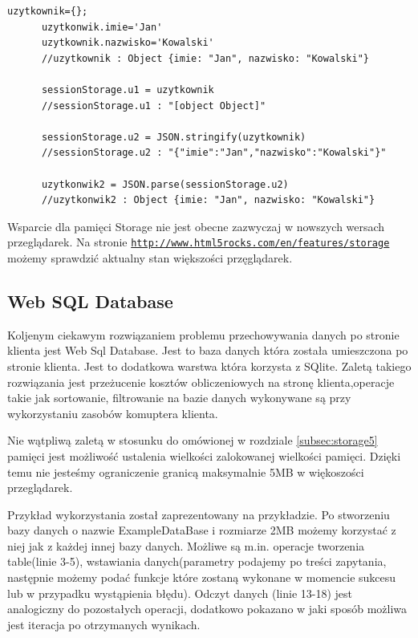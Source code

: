 \lstset{language=JavaScript}
\label{lis:storage}
\begin{lstlisting}[caption=json]
      uzytkownik={};
      uzytkonwik.imie='Jan'
      uzytkownik.nazwisko='Kowalski'
      //uzytkownik : Object {imie: "Jan", nazwisko: "Kowalski"}

      sessionStorage.u1 = uzytkownik
      //sessionStorage.u1 : "[object Object]"

      sessionStorage.u2 = JSON.stringify(uzytkownik)
      //sessionStorage.u2 : "{"imie":"Jan","nazwisko":"Kowalski"}"

      uzytkonwik2 = JSON.parse(sessionStorage.u2)
      //uzytkonwik2 : Object {imie: "Jan", nazwisko: "Kowalski"}
\end{lstlisting}



Wsparcie dla pamięci Storage nie jest obecne zazwyczaj w nowszych wersach przeglądarek. Na stronie \underline{\texttt{http://www.html5rocks.com/en/features/storage}} możemy sprawdzić aktualny stan większości przęglądarek.

\subsection{Web SQL Database}
\label{subsec:websql}

Koljenym ciekawym rozwiązaniem problemu przechowywania danych po stronie klienta jest Web Sql Database.
Jest to baza danych która została umieszczona po stronie klienta. Jest to dodatkowa warstwa która korzysta z SQlite.
Zaletą takiego rozwiązania jest przeżucenie kosztów obliczeniowych na stronę klienta,operacje takie jak sortowanie, filtrowanie na bazie danych wykonywane są przy wykorzystaniu zasobów komuptera klienta.

Nie wątpliwą zaletą w stosunku do omówionej w rozdziale \ref{subsec:storage5} pamięci jest możliwość ustalenia wielkości zalokowanej wielkości pamięci. Dzięki temu nie jesteśmy ograniczenie granicą maksymalnie 5MB w więkoszości przeglądarek.

Przykład wykorzystania został zaprezentowany na przykładzie. Po stworzeniu bazy danych o nazwie ExampleDataBase i rozmiarze 2MB możemy korzystać z niej jak z każdej innej bazy danych. Możliwe są m.in. operacje tworzenia table(linie 3-5), wstawiania danych(parametry podajemy po treści zapytania, następnie możemy podać funkcje które zostaną wykonane w momencie sukcesu lub w przypadku wystąpienia błędu). Odczyt danych (linie 13-18) jest analogiczny do pozostałych operacji, dodatkowo pokazano w jaki sposób możliwa jest iteracja po otrzymanych wynikach.

